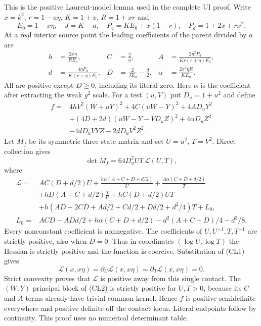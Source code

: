 \label{component:p050c7ae6d9b8}

\label{p050c7ae6d9b8:sec:c1-ui-leading}

This is the positive Laurent-model lemma used in the complete UI proof.
Write $x=k^2$, $r=1-a\eta$, $K=1+x$, $R=1+xr$ and
\[
 E_0=1-x\eta,\quad J=K-a,\quad
 P_4=KE_0+x(1-r),\quad P_d=1+2x+rx^2.
\]
At a real interior source point the leading coefficients of the
parent divided by $a$ are
\[
\begin{aligned}
 h&=\frac{2x\eta}{RE_0},& C&=\frac2a,&
 A&=\frac{2\eta^2P_4}{Kr(r+\eta)E_0},\\
 d&=\frac{4\eta P_d}{K(r+\eta)E_0},&
 D&=\frac2{JE_0}-\frac d2,&
 \alpha&=\frac{2x^2\eta R}{KE_0}.
\end{aligned}                                                     \tag{CL1}
\]
All are positive except $D\ge0$, including its literal zero. Here
$\alpha$ is the coefficient after extracting the weak $g^2$ scale.
For a test $(u,V)$ put $D_u=1+u^2$ and define
\begin{align*}
f={}&4hV^2(W+uY)^2+4C(uW-Y)^2+4AD_uY^2\\
 &+(4D+2d)(uW-Y-VD_uZ)^2+4\alpha D_uZ^2\\
 &-4dD_uVYZ-2dD_uV^2Z^2.                           \tag{CL2}
\end{align*}
Let $M_f$ be its symmetric three-state matrix and set $U=u^2$, $T=V^2$.
Direct collection gives
\[
 \det M_f=64D_u^2UT\,\mathcal L(U,T),                 \tag{CL3}
\]
where
\begin{align*}
\mathcal L={}&AC(D+d/2)U+
 \frac{h\alpha(A+C+D+d/2)}U+\frac{A\alpha(C+D+d/2)}T\\
 &+hD(A+C+d/2)\frac TU+hC(D+d/2)UT\\
 &+h(AD+2CD+Ad/2+Cd/2+Dd/2+d^2/4)T+L_0,\\
L_0={}&ACD-ADd/2+h\alpha(C+D+d/2)
                         -d^2(A+C+D)/4-d^3/8.       \tag{CL4}
\end{align*}
Every nonconstant coefficient is nonnegative. The coefficients of
$U,U^{-1},T,T^{-1}$ are strictly positive, also when $D=0$.
Thus in coordinates $(\log U,\log T)$ the Hessian is strictly
positive and the function is coercive. Substitution of (CL1) gives
\[
 \mathcal L(x,x\eta)=\partial_U\mathcal L(x,x\eta)
                   =\partial_T\mathcal L(x,x\eta)=0. \tag{CL5}
\]
Strict convexity proves that $\mathcal L$ is positive away from this
single contact. The $(W,Y)$ principal block of (CL2) is strictly
positive for $U,T>0$, because its $C$ and $A$ terms already have
trivial common kernel. Hence $f$ is positive semidefinite everywhere
and positive definite off the contact locus. Literal endpoints follow
by continuity. This proof uses no numerical determinant table.

